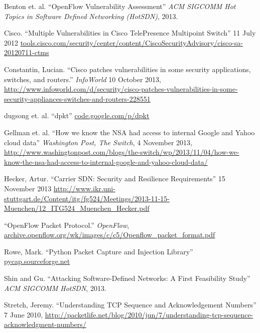 \begin{thebibliography}{99}

 Benton et. al. ``OpenFlow Vulnerability Assessment'' \emph{ACM SIGCOMM Hot Topics in Software Defined Networking (HotSDN)}, 2013. 

 Cisco. ``Multiple Vulnerabilities in Cisco TelePresence Multipoint Switch'' 11 July 2012 \url{tools.cisco.com/security/center/content/CiscoSecurityAdvisory/cisco-sa-20120711-ctms}

 Constantin, Lucian. ``Cisco patches vulnerabilities in some security applications, switches, and routers.'' \emph{InfoWorld} 10 October 2013, \url{http://www.infoworld.com/d/security/cisco-patches-vulnerabilities-in-some-security-appliances-switches-and-routers-228551}

 dugsong et. al. ``dpkt'' \url{code.google.com/p/dpkt}

 Gellman et. al. ``How we know the NSA had access to internal Google and Yahoo cloud data'' \emph{Washington Post, The Switch}, 4 November 2013, \url{http://www.washingtonpost.com/blogs/the-switch/wp/2013/11/04/how-we-know-the-nsa-had-access-to-internal-google-and-yahoo-cloud-data/}

 Hecker, Artur. ``Carrier SDN: Security and Resilience Requirements'' 15 November 2013 \url{http://www.ikr.uni-stuttgart.de/Content/itg/fg524/Meetings/2013-11-15-Muenchen/12_ITG524_Muenchen_Hecker.pdf}

 ``OpenFlow Packet Protocol.'' \emph{OpenFlow}, \url{archive.openflow.org/wk/images/c/c5/Openflow_packet_format.pdf}

 Rowe, Mark. ``Python Packet Capture and Injection Library'' \url{pycap.sourceforge.net}

 Shin and Gu. ``Attacking Software-Defined Networks: A First Feasibility Study'' \emph{ACM SIGCOMM HotSDN}, 2013.

 Stretch, Jeremy. ``Understanding TCP Sequence and Acknowledgement Numbers'' 7 June 2010, \url{http://packetlife.net/blog/2010/jun/7/understanding-tcp-sequence-acknowledgment-numbers/}

\end{thebibliography}
